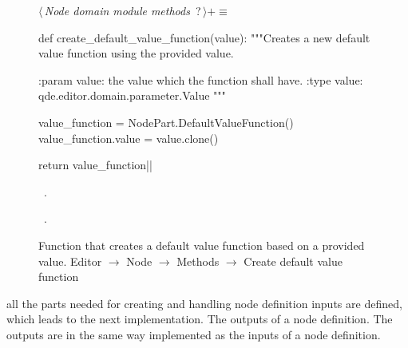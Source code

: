 \documentclass[%
    a4paper,    %
    justified,  %
    nobib,      %
    openany     %
]{tufte-book}
\begin{document}
\begin{figure}
\begin{flushleft} \small
\begin{minipage}{\linewidth}\label{scrap136}\raggedright\small
{} $\langle\,${\itshape Node domain module methods}\nobreak\ {\footnotesize {?}}$\,\rangle+\equiv$
\vspace{-1ex}
\begin{pythoncode}
def create_default_value_function(value):
    """Creates a new default value function using the provided value.

    :param value: the value which the function shall have.
    :type  value: qde.editor.domain.parameter.Value
    """

    value_function = NodePart.DefaultValueFunction()
    value_function.value = value.clone()

    return value_function|\NWsep|
\end{pythoncode}
\vspace{1.5ex}
\footnotesize
\begin{list}{}{\setlength{\itemsep}{-\parsep}\setlength{\itemindent}{-\leftmargin}}
\item \NWtxtMacroDefBy\ .
\item \NWtxtMacroRefIn\ .

\item{}
\end{list}
\end{minipage}\vspace{4ex}
\end{flushleft}
\caption{Function that creates a default value function based on a provided
  value.
  \newline{}\newline{}Editor $\rightarrow$ Node $\rightarrow$
  Methods $\rightarrow$ Create default value function}
\label{editor:lst:node:create-default-value-function}
\end{figure}

 all the parts needed for creating and
handling node definition inputs are defined, which leads to the next
implementation. The outputs of a node definition. The outputs are in the same
way implemented as the inputs of a node definition.
\end{document}
